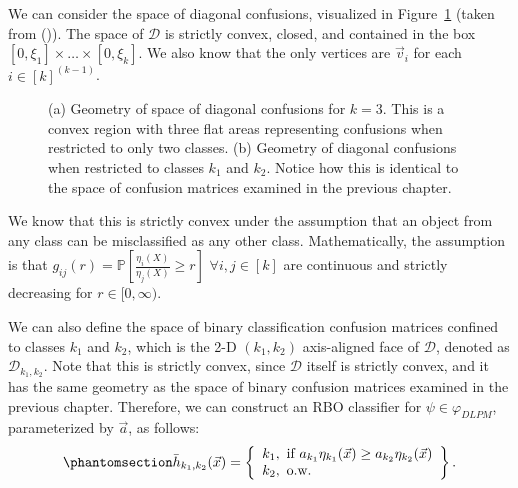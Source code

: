 \documentclass[
  letterpaper,
  numbers=noenddot,
  DIV=11]{scrreprt}
\theoremstyle{definition}
\theoremstyle{plain}
\theoremstyle{plain}
\theoremstyle{remark}
\begin{document}
We can consider the space of diagonal confusions, visualized in
Figure~\ref{fig-diag_geom} (taken from
()). The
space of \(\mathcal{D}\) is strictly convex, closed, and contained in
the box \([0, \xi_1] \times \dots \times [0, \xi_k]\). We also know that
the only vertices are \(\vec{v}_i\) for each \(i \in [k]^{(k-1)}\).

\begin{figure}


\caption{\label{fig-diag_geom}(a) Geometry of space of diagonal
confusions for \(k=3\). This is a convex region with three flat areas
representing confusions when restricted to only two classes. (b)
Geometry of diagonal confusions when restricted to classes \(k_1\) and
\(k_2\). Notice how this is identical to the space of confusion matrices
examined in the previous chapter.}

\end{figure}%

We know that this is strictly convex under the assumption that an object
from any class can be misclassified as any other class. Mathematically,
the assumption is that
\(g_{ij}(r) = \mathbb{P} \left[\frac{\eta_i(X)}{\eta_j(X)} \geq r \right]\)
\(\forall i, j \in [k]\) are continuous and strictly decreasing for
\(r \in [0, \infty)\).

We can also define the space of binary classification confusion matrices
confined to classes \(k_1\) and \(k_2\), which is the 2-D \((k_1, k_2)\)
axis-aligned face of \(\mathcal{D}\), denoted as
\(\mathcal{D}_{k_1, k_2}\). Note that this is strictly convex, since
\(\mathcal{D}\) itself is strictly convex, and it has the same geometry
as the space of binary confusion matrices examined in the previous
chapter. Therefore, we can construct an RBO classifier for
\(\psi \in \varphi_{DLPM}\), parameterized by \(\vec{a}\), as follows:
\begin{equation}\phantomsection\label{eq-rbo_eq}{\begin{aligned}
\bar{h}_{k_1, k_2}(\vec{x})= \left\{
\begin{array}{ll}
      k_1, \text{ if } a_{k_1} \eta_{k_1}(\vec{x}) \geq a_{k_2} \eta_{k_2}(\vec{x})\\
k_2, \text{ o.w.}
\end{array}
\right\}.
\end{aligned}}\end{equation}
\end{document}

